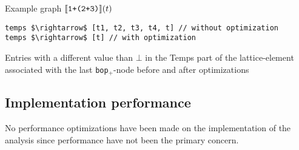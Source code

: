\begin{graph}
\centering
\begin{adjustbox}{max size={1\textwidth}{.25\textheight}, margin = 10pt}\end{adjustbox}

\caption{Example graph $\llbracket \texttt{1+(2+3)}\rrbracket(t)$}
\label{graph:exexpr1}
\end{graph}

\begin{program}
\begin{lstlisting}[mathescape]
temps $\rightarrow$ [t1, t2, t3, t4, t] // without optimization
temps $\rightarrow$ [t] // with optimization
\end{lstlisting}
\caption{Entries with a different value than $\bot$ in the Temps part of the lattice-element associated with the last \texttt{bop$_+$}-node before and after optimizations}
\label{lst:exampleLattice}
\end{program}

\subsection{Implementation performance}
No performance optimizations have been made on the implementation of the analysis since performance have not been the primary concern.

